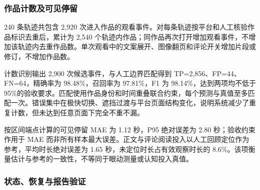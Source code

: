 \subsubsection{作品计数及可见停留}\label{section:3.4.1}

240 条轨迹共包含 2,920 次进入作品的观看事件。对每条轨迹按平台和人工核验作品标识去重后，累计为 2,540 个轨迹内作品；同作品再次打开增加观看事件，不增加该轨迹内去重作品数。单次观看中的文案展开、图像翻页和评论开关增加片段或修订，不增加作品数。

计数识别输出 2,900 次候选事件，与人工边界匹配得到 TP=2,856、FP=44、FN=64，精确率为 98.48\%，召回率为 97.81\%，F1 为 98.14\%，达到两项均不低于 95\%的验收要求。匹配使用作品身份和时间重叠联合约束，每个预测与真值至多匹配一次。错误集中在极快切换、遮挡过渡与平台页面结构变化，说明系统减少了重复计数，但未达到任意页面下完全不重不漏。

按区间端点计算的可见停留 MAE 为 1.12 秒，P95 绝对误差为 2.80 秒；验收约束作用于 MAE 而非所有样本最大误差。正文与评论阅读投入以人工回顾定位作为参考，平均时长绝对误差为 1.65 秒，未定位时长占有效观察时长的 8.6\%。该项衡量估计与参考的一致性，不等同于眼动测量或认知投入真值。

\subsubsection{状态、恢复与报告验证}\label{section:3.4.2}

